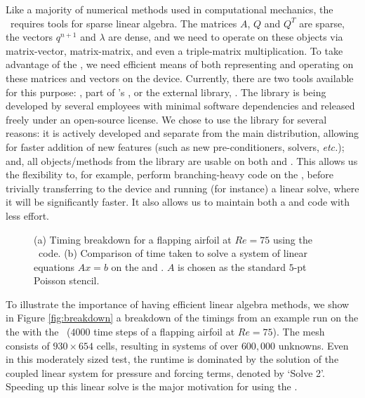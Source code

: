 

Like a majority of numerical methods used in computational mechanics, the \ibm\ requires tools for sparse linear algebra. The matrices $A$, $Q$ and $Q^T$ are sparse, the vectors $q^{n+1}$ and $\lambda$ are dense, and we need to operate on these objects via matrix-vector, matrix-matrix, and even a triple-matrix multiplication. To take advantage of the {\gpu}, we need efficient means of both representing and operating on these matrices and vectors on the device. Currently, there are two tools available for this purpose: {\cusparse}, part of {\NV}'s {\cuda}, or the external library, {\cusp}. The {\cusp} library is being developed by several {\NV} employees with minimal software dependencies and released freely under an open-source license. We chose to use the {\cusp} library for several reasons: it is actively developed and separate from the main {\cuda} distribution, allowing for faster addition of new features (such as new pre-conditioners, solvers, \emph{etc.}); and, all objects/methods from the library are usable on both {\cpu} and {\gpu}. This allows us the flexibility to, for example, perform branching-heavy code on the {\cpu}, before trivially transferring to the device and running (for instance) a linear solve, where it will be significantly faster. It also allows us to maintain both a {\cpu} and {\gpu} code with less effort.

\begin{figure*}\centering
		\caption{\small (a)  Timing breakdown for a flapping airfoil at $Re=75$ using the \gpu\ code. (b) Comparison of time taken to solve a system of linear equations $Ax=b$ on the {\cpu} and {\gpu}. $A$ is chosen as the standard $5$-pt Poisson stencil.}
\end{figure*}

To illustrate the importance of having efficient linear algebra methods, we show in Figure \ref{fig:breakdown} a breakdown of the timings from an example run on the {\gpu} the with the \ibm\ ($4000$ time steps of a flapping airfoil at $Re = 75$). The mesh consists of $930\times 654$ cells, resulting in systems of over $600,000$ unknowns. Even in this moderately sized test, the runtime is dominated by the solution of the coupled linear system for pressure and forcing terms, denoted by `Solve 2'.
Speeding up this linear solve is the major motivation for using the {\gpu}.

